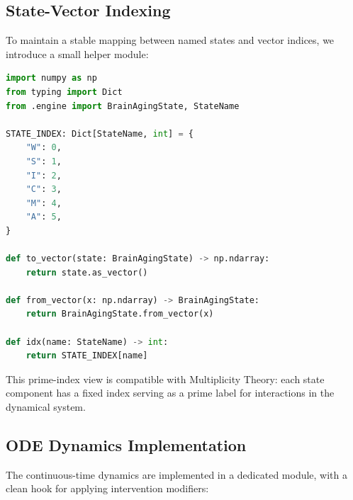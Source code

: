 \documentclass[11pt]{article}
\begin{document}
\subsection{State-Vector Indexing}

To maintain a stable mapping between named states and vector indices, we introduce
a small helper module:

\begin{lstlisting}[style=code,language=Python,caption={State vector indexing utilities.}]
import numpy as np
from typing import Dict
from .engine import BrainAgingState, StateName

STATE_INDEX: Dict[StateName, int] = {
    "W": 0,
    "S": 1,
    "I": 2,
    "C": 3,
    "M": 4,
    "A": 5,
}

def to_vector(state: BrainAgingState) -> np.ndarray:
    return state.as_vector()

def from_vector(x: np.ndarray) -> BrainAgingState:
    return BrainAgingState.from_vector(x)

def idx(name: StateName) -> int:
    return STATE_INDEX[name]
\end{lstlisting}

This prime-index view is compatible with Multiplicity Theory: each state component
has a fixed index serving as a prime label for interactions in the dynamical system.

\subsection{ODE Dynamics Implementation}

The continuous-time dynamics are implemented in a dedicated module, with a clean hook
for applying intervention modifiers:
\end{document}
